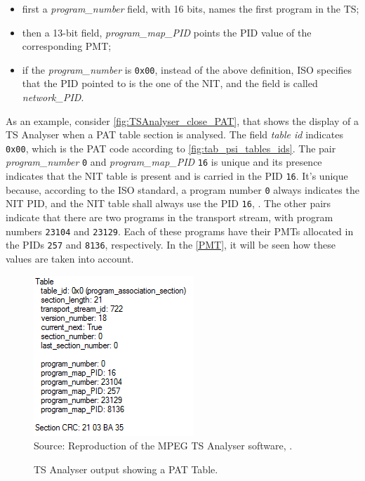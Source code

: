 \documentclass[
	12pt,				%
	openright,			%
	twoside,			%
	a4paper,			%
	brazil,
	french,				%
	english
	]{abntex2}
\begin{document}
\begin{itemize}
\item{first a \textit{program\_number} field, with 16 bits, names the first program in the TS;}
\item{ then a 13-bit field, \textit{program\_map\_PID} points the PID value of the corresponding PMT;}
\item{if the \textit{program\_number} is \texttt{0x00}, instead of the above definition, ISO specifies that the PID pointed to is the one of the NIT, and the field is called \textit{network\_PID}.}
\end{itemize}

As an example, consider \autoref{fig:TSAnalyser_close_PAT}, that shows the display of a TS Analyser when a PAT table section is analysed. The field \textit{table id} indicates \texttt{0x00}, which is the PAT code according to \autoref{fig:tab_psi_tables_ids}. The pair \textit{program\_number} \texttt{0} and \textit{program\_map\_PID} \texttt{16} is unique and its presence indicates that the NIT table is present and is carried in the PID \texttt{16}. It's unique because, according to the ISO standard, a program number \texttt{0} always indicates the NIT PID, and the NIT table shall always use the PID \texttt{16}, . The other pairs indicate that there are two programs in the transport stream, with program numbers \texttt{23104} and \texttt{23129}. Each of these programs have their PMTs allocated in the PIDs \texttt{257} and \texttt{8136}, respectively. In the \autoref{PMT}, it will be seen how these values are taken into account.

\begin{figure}[!hb]
\centering
\caption{TS Analyser output showing a PAT Table.}
\includegraphics[width=0.4\linewidth]{figuras/TSAnalyser_close_PAT.png}
\\Source: Reproduction of the MPEG TS Analyser software, \cite{TS_analyser}.
\label{fig:TSAnalyser_close_PAT}
\end{figure}
\end{document}
